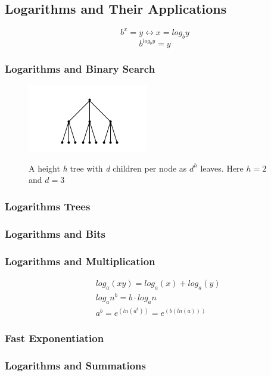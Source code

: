 \subsection{Logarithms and Their Applications}
$$b^{x} = y \leftrightarrow x = log_{b}y$$
$$b^{log_{b}y} = y$$

\subsubsection{Logarithms and Binary Search}

\begin{figure}[H]
  \centering
     \includegraphics[scale=0.9]{./2_7.png}
  \label{fig:demo-diagram2-4}
  \caption{ A height \emph{h} tree with \emph{d} children per node as \emph{$d^{h}$} leaves. Here $h=2$ and $d=3$}
\end{figure}


\subsubsection{Logarithms Trees}

\subsubsection{Logarithms and Bits}

\subsubsection{Logarithms and Multiplication}

\begin{align*}
	&log_{a}(xy) = log_{a}(x) + log_a(y) \\
	&log_{a} n^{b} = b \cdot log_{a} n \\
	&a^{b} = e^{(ln(a^{b}))} = e^{(b(ln(a)))}
\end{align*}

\subsubsection{Fast Exponentiation}

\subsubsection{Logarithms and Summations}


